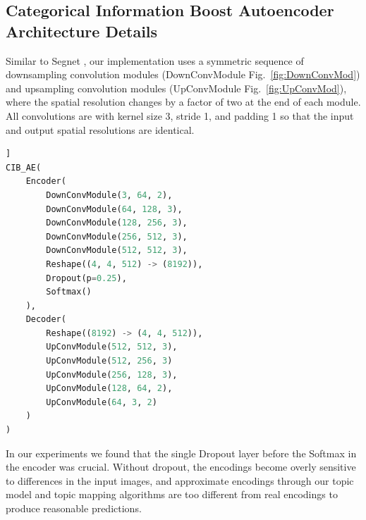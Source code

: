 
\begin{appendices}
\chapter{Categorical Information Boost Autoencoder Architecture Details} \label{ch:cibae-arch}
Similar to Segnet \citep{BadrinarayananK15}, our implementation uses a symmetric sequence of downsampling convolution modules (DownConvModule Fig.~\ref{fig:DownConvMod}) and upsampling convolution modules (UpConvModule Fig.~\ref{fig:UpConvMod}), where the spatial resolution changes by a factor of two at the end of each module. All convolutions are with kernel size 3, stride 1, and padding 1 so that the input and output spatial resolutions are identical.

\begin{lstlisting}[language=Python, caption=CIB-AE Architecture Detail, label=cibae_arch]]
CIB_AE(
    Encoder(
        DownConvModule(3, 64, 2),
        DownConvModule(64, 128, 3),
        DownConvModule(128, 256, 3),
        DownConvModule(256, 512, 3),
        DownConvModule(512, 512, 3),
        Reshape((4, 4, 512) -> (8192)),
        Dropout(p=0.25),
        Softmax()
    ), 
    Decoder(
        Reshape((8192) -> (4, 4, 512)),
        UpConvModule(512, 512, 3),
        UpConvModule(512, 256, 3)
        UpConvModule(256, 128, 3),
        UpConvModule(128, 64, 2),
        UpConvModule(64, 3, 2)
    )
)
\end{lstlisting}

In our experiments we found that the single Dropout layer before the Softmax in the encoder was crucial. Without dropout, the encodings become overly sensitive to differences in the input images, and approximate encodings through our topic model and topic mapping algorithms are too different from real encodings to produce reasonable predictions.


\end{appendices}
